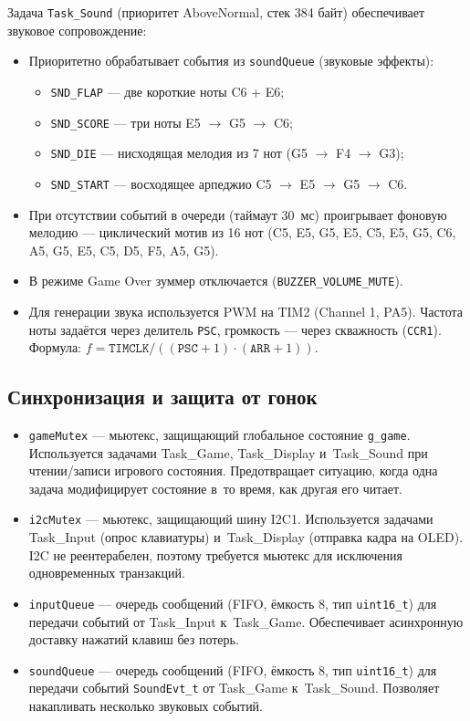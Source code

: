 \documentclass[a4paper,12pt]{article}
\begin{document}
Задача \texttt{Task\_Sound} (приоритет AboveNormal, стек 384 байт) обеспечивает звуковое сопровождение:
\begin{itemize}
    \item Приоритетно обрабатывает события из \texttt{soundQueue} (звуковые эффекты):
        \begin{itemize}
            \item \texttt{SND\_FLAP} — две короткие ноты C6 + E6;
            \item \texttt{SND\_SCORE} — три ноты E5 $\to$ G5 $\to$ C6;
            \item \texttt{SND\_DIE} — нисходящая мелодия из 7 нот (G5 $\to$ F4 $\to$ G3);
            \item \texttt{SND\_START} — восходящее арпеджио C5 $\to$ E5 $\to$ G5 $\to$ C6.
        \end{itemize}
    \item При отсутствии событий в очереди (таймаут 30~мс) проигрывает фоновую мелодию — циклический мотив из 16 нот (C5, E5, G5, E5, C5, E5, G5, C6, A5, G5, E5, C5, D5, F5, A5, G5).
    \item В режиме Game Over зуммер отключается (\texttt{BUZZER\_VOLUME\_MUTE}).
    \item Для генерации звука используется PWM на TIM2 (Channel 1, PA5). Частота ноты задаётся через делитель \texttt{PSC}, громкость — через скважность (\texttt{CCR1}). Формула: $f = \texttt{TIMCLK} / ((\texttt{PSC}+1) \cdot (\texttt{ARR}+1))$.
\end{itemize}


\subsection{Синхронизация и защита от гонок}


\begin{itemize}
    \item \texttt{gameMutex} — мьютекс, защищающий глобальное состояние \texttt{g\_game}. Используется задачами Task\_Game, Task\_Display и~Task\_Sound при чтении/записи игрового состояния. Предотвращает ситуацию, когда одна задача модифицирует состояние в~то время, как другая его читает.
    \item \texttt{i2cMutex} — мьютекс, защищающий шину I2C1. Используется задачами Task\_Input (опрос клавиатуры) и~Task\_Display (отправка кадра на OLED). I2C не реентерабелен, поэтому требуется мьютекс для исключения одновременных транзакций.
    \item \texttt{inputQueue} — очередь сообщений (FIFO, ёмкость 8, тип \texttt{uint16\_t}) для передачи событий от Task\_Input к~Task\_Game. Обеспечивает асинхронную доставку нажатий клавиш без потерь.
    \item \texttt{soundQueue} — очередь сообщений (FIFO, ёмкость 8, тип \texttt{uint16\_t}) для передачи событий \texttt{SoundEvt\_t} от Task\_Game к~Task\_Sound. Позволяет накапливать несколько звуковых событий.
\end{itemize}
\end{document}
